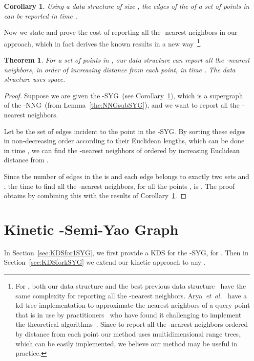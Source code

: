 \documentclass[preprint,12pt]{elsarticle}
\def\knng{\mbox{-NNG}}
\def\ksyg{\mbox{-SYG}}
\newcommand{\etal}{\emph{et~al.}}
\newtheorem{theorem}{Theorem}[section]
\newtheorem{corollary}{Corollary}[section]
\begin{document}
\begin{corollary}\label{the:kSYG_Construction}
Using a data structure of size , the edges of the  of a set of  points in  can be reported in time .
\end{corollary}

Now we state and prove the cost of reporting all the -nearest neighbors in our approach, which in fact derives the known results in a new way~\footnote{For , both our data structure and the best previous data structure~\cite{Dickerson:1996:APP:236464.236474} have the same complexity for reporting all the -nearest neighbors. Arya~\etal~\cite{Arya:1998:OAA:293347.293348} have a kd-tree implementation to approximate the nearest neighbors of a query point that is in use by practitioners~\cite{10.1109/TVCG.2010.9} who have found it challenging to implement the theoretical algorithms~\cite{Vaidya:1989:ONL:70530.70532,Callahan366854,Clarkson:1983:FAN:1382437.1382825,Dickerson:1996:APP:236464.236474}. Since to report all the -nearest neighbors ordered by distance from each point our method uses multidimensional range trees, which can be easily implemented, we believe our method may be useful in practice.}.



\begin{theorem}\label{the:kNNG_Construction}
For a set of  points in , our data structure can report all the -nearest neighbors, in order of increasing distance from each point, in time . The data structure uses  space.
\end{theorem}
\begin{proof}
Suppose we are given the \ksyg~(see Corollary~\ref{the:kSYG_Construction}), which is a supergraph of the \knng~(from Lemma~\ref{the:NNGsubSYG}), and we want to report all the -nearest neighbors. 

Let  be the set of edges incident to the point  in the \ksyg. By sorting these edges in non-decreasing order according to their Euclidean lengths, which can be done in time , we can find the -nearest neighbors of   ordered by increasing Euclidean distance from . 

Since the number of edges in the  is  and each edge  belongs to exactly two sets  and , the time to find all the -nearest neighbors, for all the points , is . The proof obtains by combining this with the results of Corollary~\ref{the:kSYG_Construction}.
\end{proof}

\section{Kinetic -Semi-Yao Graph}\label{sec:kineticKSYG}
In Section~\ref{sec:KDSfor1SYG}, we first provide a KDS for the \ksyg, for . Then in Section~\ref{sec:KDSforkSYG} we extend our kinetic approach to any .
\end{document}
